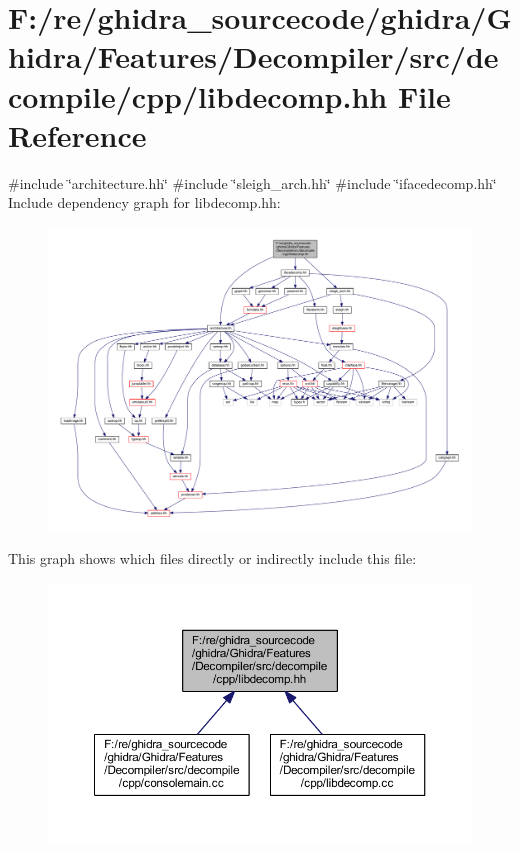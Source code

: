 \hypertarget{libdecomp_8hh}{}\section{F\+:/re/ghidra\+\_\+sourcecode/ghidra/\+Ghidra/\+Features/\+Decompiler/src/decompile/cpp/libdecomp.hh File Reference}
\label{libdecomp_8hh}
{\ttfamily \#include \char`\"{}architecture.\+hh\char`\"{}}\newline
{\ttfamily \#include \char`\"{}sleigh\+\_\+arch.\+hh\char`\"{}}\newline
{\ttfamily \#include \char`\"{}ifacedecomp.\+hh\char`\"{}}\newline
Include dependency graph for libdecomp.\+hh\+:
\nopagebreak
\begin{figure}[H]
\begin{center}
\leavevmode
\includegraphics[width=350pt]{libdecomp_8hh__incl}
\end{center}
\end{figure}
This graph shows which files directly or indirectly include this file\+:
\nopagebreak
\begin{figure}[H]
\begin{center}
\leavevmode
\includegraphics[width=350pt]{libdecomp_8hh__dep__incl}
\end{center}
\end{figure}
